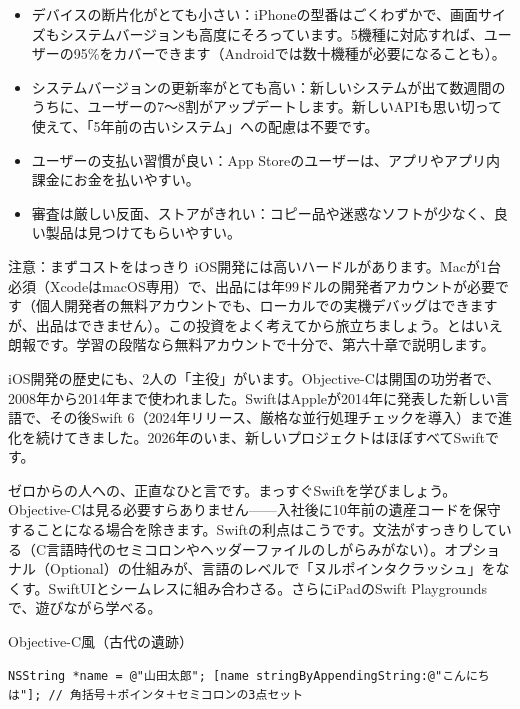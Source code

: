 \begin{itemize}
  \item デバイスの断片化がとても小さい：iPhoneの型番はごくわずかで、画面サイズもシステムバージョンも高度にそろっています。5機種に対応すれば、ユーザーの95\%をカバーできます（Androidでは数十機種が必要になることも）。
  \item システムバージョンの更新率がとても高い：新しいシステムが出て数週間のうちに、ユーザーの7〜8割がアップデートします。新しいAPIも思い切って使えて、「5年前の古いシステム」への配慮は不要です。
  \item ユーザーの支払い習慣が良い：App Storeのユーザーは、アプリやアプリ内課金にお金を払いやすい。
  \item 審査は厳しい反面、ストアがきれい：コピー品や迷惑なソフトが少なく、良い製品は見つけてもらいやすい。
\end{itemize}

\begin{tcbwarn}{注意：まずコストをはっきり}
iOS開発には高いハードルがあります。Macが1台必須（XcodeはmacOS専用）で、出品には年99ドルの開発者アカウントが必要です（個人開発者の無料アカウントでも、ローカルでの実機デバッグはできますが、出品はできません）。この投資をよく考えてから旅立ちましょう。とはいえ朗報です。学習の段階なら無料アカウントで十分で、第六十章で説明します。

\end{tcbwarn}


iOS開発の歴史にも、2人の「主役」がいます。Objective-Cは開国の功労者で、2008年から2014年まで使われました。SwiftはAppleが2014年に発表した新しい言語で、その後Swift 6（2024年リリース、厳格な並行処理チェックを導入）まで進化を続けてきました。2026年のいま、新しいプロジェクトはほぼすべてSwiftです。

ゼロからの人への、正直なひと言です。まっすぐSwiftを学びましょう。Objective-Cは見る必要すらありません——入社後に10年前の遺産コードを保守することになる場合を除きます。Swiftの利点はこうです。文法がすっきりしている（C言語時代のセミコロンやヘッダーファイルのしがらみがない）。オプショナル（Optional）の仕組みが、言語のレベルで「ヌルポインタクラッシュ」をなくす。SwiftUIとシームレスに組み合わさる。さらにiPadのSwift Playgroundsで、遊びながら学べる。

Objective-C風（古代の遺跡）

\begin{lstlisting}
NSString *name = @"山田太郎"; [name stringByAppendingString:@"こんにちは"]; // 角括号＋ポインタ＋セミコロンの3点セット
\end{lstlisting}

